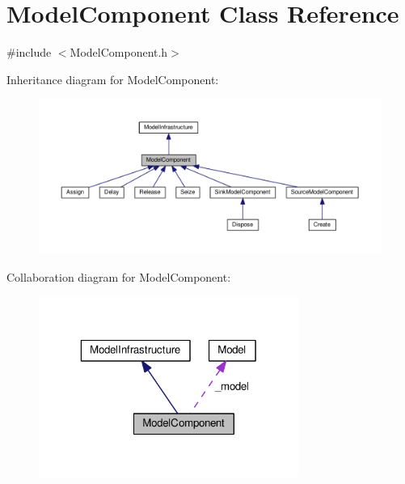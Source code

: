 \hypertarget{class_model_component}{\section{Model\-Component Class Reference}
\label{class_model_component}
}


{\ttfamily \#include $<$Model\-Component.\-h$>$}



Inheritance diagram for Model\-Component\-:\nopagebreak
\begin{figure}[H]
\begin{center}
\leavevmode
\includegraphics[width=350pt]{class_model_component__inherit__graph}
\end{center}
\end{figure}


Collaboration diagram for Model\-Component\-:\nopagebreak
\begin{figure}[H]
\begin{center}
\leavevmode
\includegraphics[width=241pt]{class_model_component__coll__graph}
\end{center}
\end{figure}
